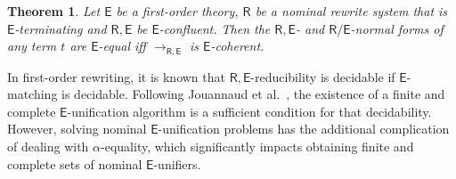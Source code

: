 \documentclass[11pt,a4paper]{amsart}
\newcommand{\daniele}[1]{\textcolor{cyan}{#1}}
\newcommand{\caleq}{\approx_{\alpha,\theory{C}}}
\newcommand{\alert}[1]{\textcolor{red}{#1}}
\newcommand{\theory}[1]{\ensuremath{\mathsf{#1}}}
\theoremstyle{plain}
\newtheorem{theorem}{Theorem}[section]
\newtheorem{proposition}[theorem]{Proposition}
\theoremstyle{definition}
\theoremstyle{remark}
\begin{document}

\begin{theorem}\label{prop:nom-e-coherence}
Let \theory{E}
be a first-order theory, 
\theory{R} be a nominal rewrite system that is
\theory{E}-terminating
and \theory{R,E} be \theory{E}-confluent. 
Then the \theory{R,E}- and \theory{R/E}-normal forms of any term $t$ are \theory{E}-equal iff $\to_{\theory{R,E}}$ is \theory{E}-coherent.
\end{theorem}






In first-order rewriting, it is known that  $\theory{R,E}$-reducibility is decidable if  $\theory{E}$-matching is decidable.  Following Jouannaud et al.~\cite{JouannaudKK83:Incremental},   the existence of a finite and complete $\theory{E}$-unification 
algorithm is a sufficient condition for that decidability. 
However, solving nominal $\theory{E}$-unification problems has the additional complication of dealing with $\alpha$-equality, which significantly impacts obtaining finite and complete sets of nominal $\theory{E}$-unifiers.



\end{document}
